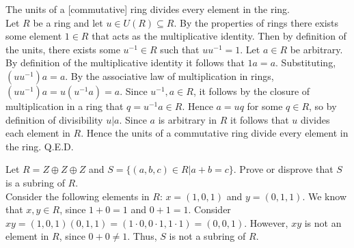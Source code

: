 \documentclass{article}
\begin{document}
 The units of a [commutative] ring divides every element in the ring.\\

  Let $R$ be a ring and let $u\in U(R)\subseteq R$. By the properties of rings there exists some element $1\in R$ that acts as the multiplicative identity. Then by definition of the units, there exists some $u^{-1}\in R$ such that $uu^{-1} = 1$. Let $a\in R$ be arbitrary. By definition of the multiplicative identity it follows that $1a = a$. Substituting, $(uu^{-1})a = a$. By the associative law of multiplication in rings, $(uu^{-1})a = u(u^{-1}a) = a$. Since $u^{-1},a\in R$, it follows by the closure of multiplication in a ring that $q = u^{-1}a\in R$. Hence $a = uq$ for some $q\in R$, so by definition of divisibility $u|a$. Since $a$ is arbitrary in $R$ it follows that $u$ divides each element in $R$. Hence the units of a commutative ring divide every element in the ring. Q.E.D.\\

\newpage

 Let $R=Z\oplus Z\oplus Z$ and $S=\{(a,b,c) \in R | a+b=c\}$. Prove or disprove that $S$ is a subring of $R$.\\

 Consider the following elements in $R$: $x=(1,0,1)$ and $y=(0,1,1)$. We know that $x,y \in R$, since $1+0=1$ and $0+1=1$. Consider $xy=(1,0,1)(0,1,1)=(1 \cdot 0, 0 \cdot 1, 1 \cdot 1)=(0,0,1)$. However, $xy$ is not an element in $R$, since $0+0 \ne 1$. Thus, $S$ is not a subring of $R$.
\end{document}
